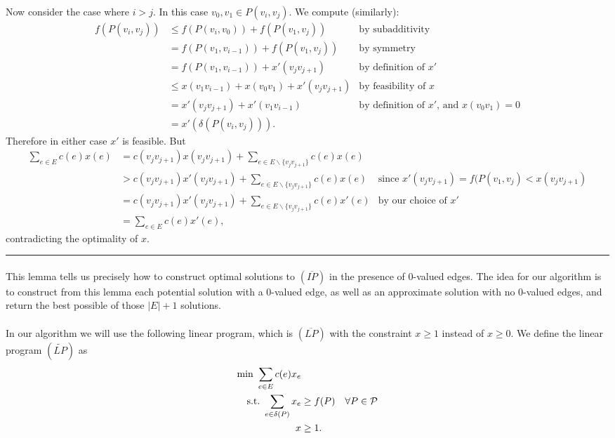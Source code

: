 \documentclass[letterpaper,12pt,oneside,onecolumn]{article}
\newenvironment{proof}{{\bf Proof:  }}{\hfill\rule{2mm}{2mm}}
\begin{document}
\begin{proof}
\paragraph{}
Now consider the case where $i > j$. In this case $v_0,v_1 \in P(v_i,v_j)$. We compute (similarly):
\begin{align*}
f(P(v_i,v_j))&\leq f(P(v_{i}, v_0)) + f(P(v_{1},v_{j})) &\text{by subadditivity} \\
&= f(P(v_1, v_{i-1})) + f(P(v_1, v_{j})) &\text{by symmetry} \\
&= f(P(v_1,v_{i-1})) + x'(v_jv_{j+1}) &\text{by definition of $x'$} \\
&\leq x(v_1v_{i-1}) + x(v_0v_1) + x'(v_jv_{j+1}) &\text{by feasibility of $x$} \\
&= x'(v_jv_{j+1}) + x'(v_1v_{i-1}) &\text{by definition of $x'$, and $x(v_0v_1)=0$} \\
&=x'(\delta(P(v_i,v_j))).
\end{align*}
Therefore in either case $x'$ is feasible. But
\begin{align*}
\sum_{e\in E} c(e) x(e) &= c(v_jv_{j+1})x(v_jv_{j+1}) + \sum_{e\in E\backslash\{v_jv_{j+1}\}} c(e)x(e) \\
&> c(v_jv_{j+1})x'(v_jv_{j+1}) +  \sum_{e\in E\backslash\{v_jv_{j+1}\}} c(e)x(e) &\text{since $x'(v_jv_{j+1}) = f(P(v_1,v_j) < x(v_jv_{j+1})$} \\
&= c(v_jv_{j+1})x'(v_jv_{j+1}) + \sum_{e\in E\backslash\{v_jv_{j+1}\}} c(e)x'(e) &\text{by our choice of $x'$} \\
&= \sum_{e\in E} c(e) x'(e),
\end{align*}
contradicting the optimality of $x$.
\end{proof}
\paragraph{}
This lemma tells us precisely how to construct optimal solutions to $(\overline{IP})$ in the presence of $0$-valued edges. The idea for our algorithm is to construct from this lemma each potential solution with a $0$-valued edge, as well as an approximate solution with no $0$-valued edges, and return the best possible of those $|E|+1$ solutions.
\paragraph{}
In our algorithm we will use the following linear program, which is $(\overline{LP})$ with the constraint $x \geq 1$ instead of $x\geq 0$. We define the linear program $(\tilde{LP})$ as
\begin{align*}
\min\ \sum_{e\in E} c(e) x_e&\\
\text{s.t.}\  \sum_{e\in\delta(P)} x_e &\geq f(P) &\forall P \in \mathcal{P} \\
x&\geq 1.
\end{align*}
\end{document}
